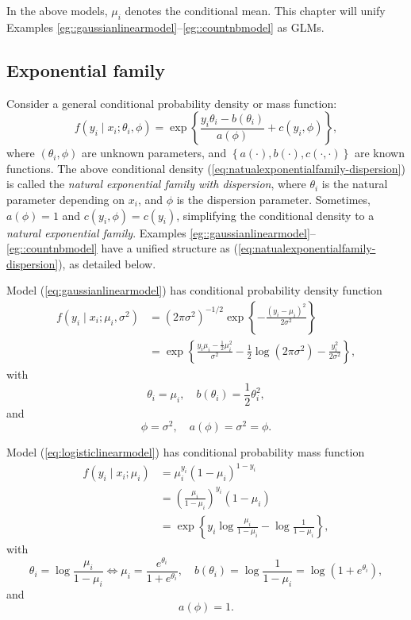 In the above models, $\mu_i$ denotes the conditional mean. This chapter 
will unify Examples \ref{eg::gaussianlinearmodel}--\ref{eg::countnbmodel} as GLMs. 

\subsection{Exponential family\label{subsec:Exponential-family}}

Consider a general conditional probability density or mass function:
\begin{equation}
f(y_{i}\mid x_{i};\theta_{i},\phi)=\exp\left\{ \frac{y_{i}\theta_{i}-b(\theta_{i})}{a(\phi)}+c(y_{i},\phi)\right\} ,\label{eq:natualexponentialfamily-dispersion}
\end{equation}
where $(\theta_{i},\phi)$ are unknown parameters, and $\left\{ a(\cdot),  b(\cdot),c(\cdot,\cdot)\right\} $
are known functions. The above conditional density (\ref{eq:natualexponentialfamily-dispersion})
is called the {\it natural exponential family with dispersion}, where $\theta_{i}$
is the natural parameter depending on $x_{i}$, and $\phi$ is the
dispersion parameter. Sometimes, $a(\phi)=1$ and $c(y_{i},\phi)=c(y_{i})$,
simplifying the conditional density to a {\it natural exponential family}. Examples \ref{eg::gaussianlinearmodel}--\ref{eg::countnbmodel}
have a unified structure as (\ref{eq:natualexponentialfamily-dispersion}), as detailed below. 

\setcounter{example}{0}
\begin{example}[continued]\label{eg::gaussianlinearmodel-continue}
 Model (\ref{eq:gaussianlinearmodel}) has conditional probability
density function
\begin{align*}
f(y_{i}  \mid x_{i};\mu_{i},\sigma^{2}) &=(2\pi\sigma^{2})^{-1/2}\exp\left\{ -\frac{(y_{i}-\mu_{i})^{2}}{2\sigma^{2}}\right\} \\
 & =\exp\left\{ \frac{y_{i}\mu_{i}-\frac{1}{2}\mu_{i}^{2}}{\sigma^{2}}-\frac{1}{2}\log(2\pi\sigma^{2})-\frac{y_{i}^{2}}{2\sigma^{2}}\right\} ,
\end{align*}
with 
\[
\theta_{i}=\mu_{i},\quad b(\theta_{i})=\frac{1}{2}\theta_{i}^{2},
\]
and
$$
\phi=\sigma^{2},\quad a(\phi)=\sigma^{2} = \phi.
$$ 
\end{example}



\begin{example}[continued]\label{eg::binarylogisticmodel-continue}
 Model (\ref{eq:logisticlinearmodel}) has conditional probability
mass function
\begin{align*}
f(y_{i}  \mid x_{i};\mu_{i}) &=\mu_{i}^{y_{i}}(1-\mu_{i})^{1-y_{i}} \\
&=\left(\frac{\mu_{i}}{1-\mu_{i}}\right)^{y_{i}}(1-\mu_{i})\\
 & =\exp\left\{ y_{i}\log\frac{\mu_{i}}{1-\mu_{i}}-\log\frac{1}{1-\mu_{i}}\right\} ,
\end{align*}
with
\[
\theta_{i}=\log\frac{\mu_{i}}{1-\mu_{i}} \Longleftrightarrow \mu_i = \frac{e^{\theta_{i}}}{1 + e^{\theta_{i}}},
\quad b(\theta_{i})=\log\frac{1}{1-\mu_{i}}=\log(1+e^{\theta_{i}}),
\]
and
$$
 a(\phi)=1.
$$
\end{example}


